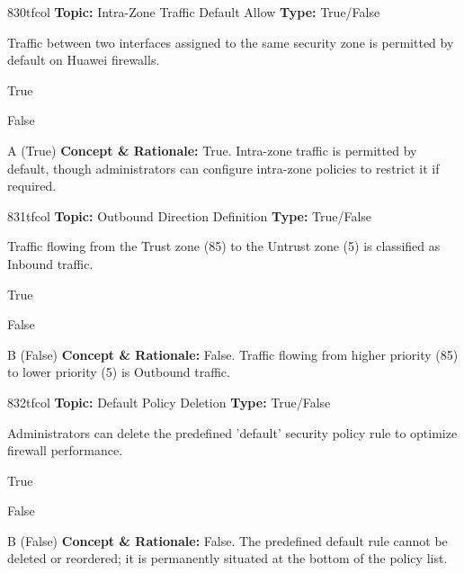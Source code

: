 \begin{qcard}{830}{tfcol}
\textcolor{darkslate!75}{\small\textbf{Topic:} Intra-Zone Traffic Default Allow \hfill \textbf{Type:} True/False}\vspace{0.4em}\par
Traffic between two interfaces assigned to the same security zone is permitted by default on Huawei firewalls.
\begin{qoptions}
\item True
\item False
\end{qoptions}
\end{qcard}
\nopagebreak
\begin{explainbox}{A (True)}
\textbf{Concept \& Rationale:} True. Intra-zone traffic is permitted by default, though administrators can configure intra-zone policies to restrict it if required.
\end{explainbox}

\begin{qcard}{831}{tfcol}
\textcolor{darkslate!75}{\small\textbf{Topic:} Outbound Direction Definition \hfill \textbf{Type:} True/False}\vspace{0.4em}\par
Traffic flowing from the Trust zone (85) to the Untrust zone (5) is classified as Inbound traffic.
\begin{qoptions}
\item True
\item False
\end{qoptions}
\end{qcard}
\nopagebreak
\begin{explainbox}{B (False)}
\textbf{Concept \& Rationale:} False. Traffic flowing from higher priority (85) to lower priority (5) is Outbound traffic.
\end{explainbox}

\begin{qcard}{832}{tfcol}
\textcolor{darkslate!75}{\small\textbf{Topic:} Default Policy Deletion \hfill \textbf{Type:} True/False}\vspace{0.4em}\par
Administrators can delete the predefined 'default' security policy rule to optimize firewall performance.
\begin{qoptions}
\item True
\item False
\end{qoptions}
\end{qcard}
\nopagebreak
\begin{explainbox}{B (False)}
\textbf{Concept \& Rationale:} False. The predefined default rule cannot be deleted or reordered; it is permanently situated at the bottom of the policy list.
\end{explainbox}

